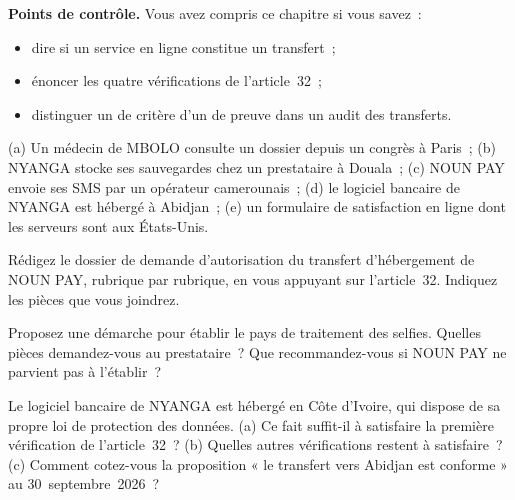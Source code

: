 \begin{boxinfo}
\textbf{Points de contrôle.} Vous avez compris ce chapitre si vous savez~:
\begin{itemize}
    \item dire si un service en ligne constitue un transfert~;
    \item énoncer les quatre vérifications de l'article~32~;
    \item distinguer un \NEK{} de critère d'un \NEK{} de preuve dans un audit
          des transferts.
\end{itemize}
\end{boxinfo}

\begin{boxexo}[title={\ding{45}\quad Exercice~14.1. Transfert ou non \niveaubase}]
(a) Un médecin de MBOLO consulte un dossier depuis un congrès à Paris~;
(b) NYANGA stocke ses sauvegardes chez un prestataire à Douala~; (c) NOUN
PAY envoie ses SMS par un opérateur camerounais~; (d) le logiciel bancaire
de NYANGA est hébergé à Abidjan~; (e) un formulaire de satisfaction en ligne
dont les serveurs sont aux États-Unis.
\end{boxexo}

\begin{boxexo}[title={\ding{45}\quad Exercice~14.2. Le dossier d'autorisation \niveaumoyen}]
Rédigez le dossier de demande d'autorisation du transfert d'hébergement de
NOUN PAY, rubrique par rubrique, en vous appuyant sur l'article~32.
Indiquez les pièces que vous joindrez.
\end{boxexo}

\begin{boxexo}[title={\ding{45}\quad Exercice~14.3. Les selfies \niveaumoyen}]
Proposez une démarche pour établir le pays de traitement des selfies.
Quelles pièces demandez-vous au prestataire~? Que recommandez-vous si
NOUN PAY ne parvient pas à l'établir~?
\end{boxexo}

\begin{boxexo}[title={\ding{45}\quad Exercice~14.4. Abidjan \niveauexpert}]
Le logiciel bancaire de NYANGA est hébergé en Côte d'Ivoire, qui dispose de
sa propre loi de protection des données. (a) Ce fait suffit-il à satisfaire
la première vérification de l'article~32~? (b) Quelles autres
vérifications restent à satisfaire~? (c) Comment cotez-vous la proposition
« le transfert vers Abidjan est conforme » au 30~septembre~2026~?
\end{boxexo}

